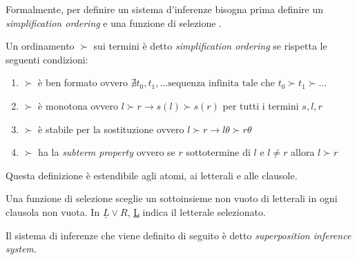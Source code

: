 Formalmente, per definire un sistema d'inferenze bisogna prima definire un \emph{simplification ordering} e una funzione di selezione \cite{kovacs2013first,riazanov2002design}.
\begin{definition}
    Un ordinamento $\succ$ sui termini è detto \emph{simplification ordering} se rispetta le seguenti condizioni:
    \begin{enumerate}
        \item $\succ$ è ben formato ovvero $\nexists t_0,t_1, \dots \text{sequenza infinita tale che } t_0 \succ t_1 \succ \dots$
        \item $\succ$ è monotona ovvero $l \succ r \rightarrow s(l)\succ s(r)$ per tutti i termini $s,l,r$
        \item $\succ$ è stabile per la sostituzione ovvero $l \succ r \rightarrow l\theta \succ r\theta$
        \item $\succ$ ha la \emph{subterm property} ovvero se $r$ sottotermine di $l$ e $l\neq r$ allora $l\succ r$   
    \end{enumerate}
\end{definition}
Questa definizione è estendibile agli atomi, ai letterali e alle clausole.
\begin{definition}
    Una funzione di selezione sceglie un sottoinsieme non vuoto di letterali in ogni clausola non vuota. In $\underline{L}\lor R$, \underline{L} indica il letterale selezionato.
\end{definition}
Il sistema di inferenze che viene definito di seguito è detto \emph{superposition inference system}.
